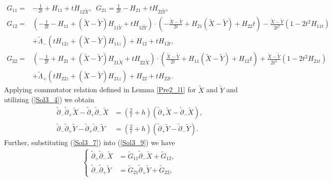 \documentclass[3p,11pt]{elsarticle}
\numberwithin{equation}{section}
\begin{document}
\begin{equation*}\label{Sol3_8}
    \begin{split}
          G_{11}=&-\frac{1}{2t}+H_{11}+tH_{12\widetilde X},\;\; G_{21}=\frac{1}{2t}-H_{21}+tH_{22\widetilde Y},\\
        G_{12}=&\left(-\frac{1}{2t}-H_{11}+(\widetilde X-\widetilde Y)H_{11\widetilde Y}+tH_{12\widetilde Y}\right)\cdot \left(-\frac{\widetilde X-\widetilde Y}{2t}+H_{21}(\widetilde X-\widetilde Y)+H_{22}t\right)-\frac{\widetilde X-\widetilde Y}{2t^2}(1-2t^2H_{11t})\\ &+\tilde \Lambda_-(tH_{12z}+(\widetilde X-\widetilde Y)H_{11z})+H_{12}+tH_{12t},\\
        G_{22}=&\left(-\frac{1}{2t}+H_{21}+(\widetilde X-\widetilde Y)H_{21\widetilde X}+tH_{22\widetilde X}\right)\cdot \left(\frac{\widetilde X-\widetilde Y}{2t}+H_{11}(\widetilde X-\widetilde Y)+H_{12}t\right)+\frac{\widetilde X-\widetilde Y}{2t^2}(1-2t^2H_{21t})\\ &+\tilde \Lambda_+(tH_{22z}+(\widetilde X-\widetilde Y)H_{21z})+H_{22}+tH_{22t}.
    \end{split}    
\end{equation*}
Applying commutator relation defined in Lemma \ref{Pre2_l1} for $\widetilde X$ and $\widetilde Y$ and utilizing (\ref{Sol3_4}) we obtain
\begin{equation}\label{Sol3_9}
    \begin{split}
        \tilde\partial_-\tilde\partial_+\widetilde X-\tilde\partial_+\tilde\partial_-\widetilde X&=\left(\frac{2}{t}+h\right)(\tilde\partial_+\widetilde X-\tilde\partial_-\widetilde X),\\
        \tilde\partial_-\tilde\partial_+\widetilde Y-\tilde\partial_+\tilde\partial_-\widetilde Y&=\left(\frac{2}{t}+h\right)(\tilde\partial_+\widetilde Y-\tilde\partial_-\widetilde Y).
    \end{split}
\end{equation}
Further, substituting (\ref{Sol3_7}) into (\ref{Sol3_9}) we have
\begin{equation}\label{Sol3_10}
    \begin{split}
        \begin{cases}
            \tilde\partial_+\tilde\partial_-\widetilde X&=\widetilde G_{11}\tilde\partial_-\widetilde X+\widetilde G_{12},\\
            \tilde\partial_-\tilde\partial_+\widetilde Y&=\widetilde G_{21}\tilde\partial_+\widetilde Y+\widetilde G_{22},
        \end{cases}
    \end{split}
\end{equation}
\end{document}
